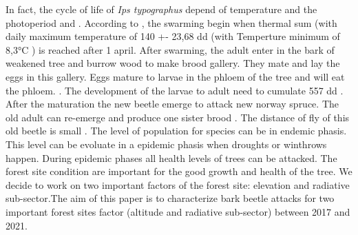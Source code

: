 \documentclass[3p,procedia]{elsarticle}
\begin{document}
In fact, the cycle of life of \textit{Ips typographus} depend of temperature and the photoperiod \citep{baier_phenipscomprehensive_2007} and \citep{annila_influence_1969}.
According to \citep{baier_phenipscomprehensive_2007}, the swarming begin when thermal sum (with daily maximum temperature  of 140 +- 23,68 dd (with Temperture minimum of 8,3°C ) is reached after 1 april.
After swarming, the adult enter in the bark of weakened tree and burrow wood to make brood gallery. They mate and lay the eggs in this gallery. Eggs mature to larvae in the phloem of the tree and will eat the phloem. \citep{hlasny_bark_2021}. The development of the larvae to adult need to cumulate 557 dd \citep{baier_phenipscomprehensive_2007}. After the maturation the new beetle emerge to attack new norway spruce.
The old adult can re-emerge and produce one sister brood . The distance of fly of this old beetle is small \citep{zolubas_1995}. The level of population for species can be in endemic phasis. This level can be evoluate in a epidemic phasis when droughts or winthrows happen. During epidemic phases all health levels of trees can be attacked. The forest site condition are important for the good growth and health of the tree. We decide to work on two important factors of the forest site: elevation and radiative sub-sector.The aim of this paper is to characterize bark beetle attacks for two important forest sites factor (altitude and radiative sub-sector) between 2017 and 2021.  









\end{document}
